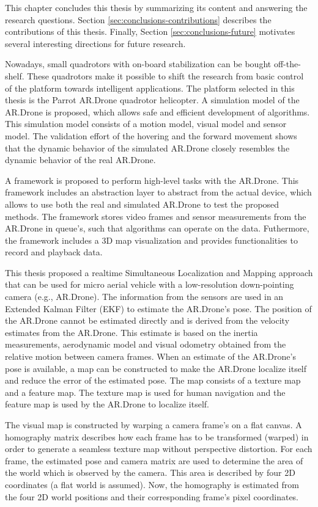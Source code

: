 This chapter concludes this thesis by summarizing its content and answering the research questions.
Section \ref{sec:conclusions-contributions} describes the contributions of this thesis.
Finally, Section \ref{sec:conclusions-future} motivates several interesting directions for future research.

Nowadays, small quadrotors with on-board stabilization can be bought off-the-shelf.
These quadrotors make it possible to shift the research from basic control of the platform towards intelligent applications.
The platform selected in this thesis is the Parrot AR.Drone quadrotor helicopter.
A simulation model of the AR.Drone is proposed, which allows safe and efficient development of algorithms.
This simulation model consists of a motion model, visual model and sensor model.
The validation effort of the hovering and the forward movement shows that the dynamic behavior of the simulated AR.Drone closely resembles the dynamic behavior of the real AR.Drone.

A framework is proposed to perform high-level tasks with the AR.Drone.
This framework includes an abstraction layer to abstract from the actual device, which allows to use both the real and simulated AR.Drone to test the proposed methods.
The framework stores video frames and sensor measurements from the AR.Drone in queue's, such that algorithms can operate on the data.
Futhermore, the framework includes a 3D map visualization and provides functionalities to record and playback data.

This thesis proposed a realtime Simultaneous Localization and Mapping approach that can be used for micro aerial vehicle with a low-resolution down-pointing camera (e.g., AR.Drone).
The information from the sensors are used in an Extended Kalman Filter (EKF) to estimate the AR.Drone's pose.
The position of the AR.Drone cannot be estimated directly and is derived from the velocity estimates from the AR.Drone.
This estimate is based on the inertia measurements, aerodynamic model and visual odometry obtained from the relative motion between camera frames.
When an estimate of the AR.Drone's pose is available, a map can be constructed to make the AR.Drone localize itself and reduce the error of the estimated pose.
The map consists of a texture map and a feature map.
The texture map is used for human navigation and the feature map is used by the AR.Drone to localize itself.

The visual map is constructed by warping a camera frame's on a flat canvas.
A homography matrix describes how each frame has to be transformed (warped) in order to generate a seamless texture map without perspective distortion.
For each frame, the estimated pose and camera matrix are used to determine the area of the world which is observed by the camera.
This area is described by four 2D coordinates (a flat world is assumed).
Now, the homography is estimated from the four 2D world positions and their corresponding frame's pixel coordinates.

